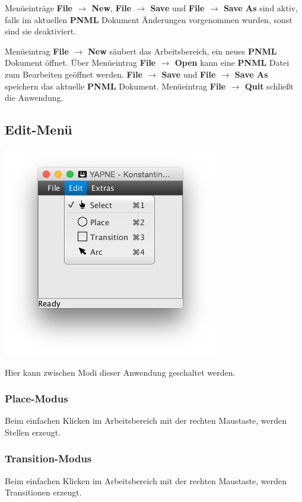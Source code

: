 \documentclass[12pt]{article}
\begin{document}
Menüeinträge \textbf{File $\rightarrow$ New}, \textbf{File $\rightarrow$ Save} und \textbf{File $\rightarrow$ Save As} sind aktiv, falls im aktuellen \textbf{PNML} Dokument Änderungen vorgenommen wurden, sonst sind sie deaktiviert.

Menüeintrag \textbf{File $\rightarrow$ New} säubert das Arbeitsbereich, ein neues \textbf{PNML} Dokument öffnet.
Über Menüeintrag \textbf{File $\rightarrow$ Open} kann eine \textbf{PNML} Datei zum Bearbeiten geöffnet werden. \textbf{File $\rightarrow$ Save} und \textbf{File $\rightarrow$ Save As} speichern das aktuelle \textbf{PNML} Dokument.
Menüeintrag \textbf{File $\rightarrow$ Quit} schließt die Anwendung.

\subsection{Edit-Menü} 

\includegraphics{menu_edit}

Hier kann zwischen Modi dieser Anwendung geschaltet werden.

\subsubsection{Place-Modus}
Beim einfachen Klicken im Arbeitsbereich mit der rechten Maustaste, werden Stellen erzeugt.

\subsubsection{Transition-Modus}
Beim einfachen Klicken im Arbeitsbereich mit der rechten Maustaste, werden Transitionen erzeugt.
\end{document}

